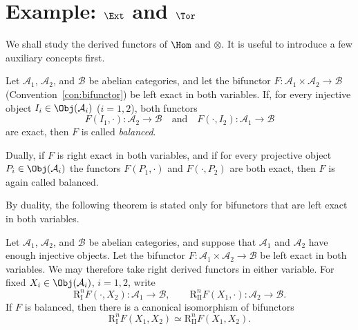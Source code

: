 
\section{Example: \texorpdfstring{$\Ext$}{Ext} and \texorpdfstring{$\Tor$}{Tor}}\label{sec:Ext-Tor}
\hypertarget{o014.aljabr2.chapter3.ext-tor}{ }

We shall study the derived functors of $\Hom$ and $\otimes$. It is useful to
introduce a few auxiliary concepts first.

\begin{definition}\label{def:balanced-functor}
Let $\mathcal{A}_1$, $\mathcal{A}_2$, and $\mathcal{B}$ be abelian categories,
and let the bifunctor $F:\mathcal{A}_1\times\mathcal{A}_2\to\mathcal{B}$
(Convention~\ref{con:bifunctor}) be left exact in both variables. If, for
every injective object $I_i\in\Obj(\mathcal{A}_i)$ ($i=1,2$), both functors
\[
F(I_1,\cdot):\mathcal{A}_2\to\mathcal{B}\quad\text{and}\quad
F(\cdot,I_2):\mathcal{A}_1\to\mathcal{B}
\]
are exact, then $F$ is called \emph{balanced}.

Dually, if $F$ is right exact in both variables, and if for every projective
object $P_i\in\Obj(\mathcal{A}_i)$ the functors $F(P_1,\cdot)$ and
$F(\cdot,P_2)$ are both exact, then $F$ is again called balanced.
\end{definition}

By duality, the following theorem is stated only for bifunctors that are left
exact in both variables.

\begin{theorem}\label{prop:balanced-primer}
Let $\mathcal{A}_1$, $\mathcal{A}_2$, and $\mathcal{B}$ be abelian
categories, and suppose that $\mathcal{A}_1$ and $\mathcal{A}_2$ have enough
injective objects. Let the bifunctor
$F:\mathcal{A}_1\times\mathcal{A}_2\to\mathcal{B}$ be left exact in both
variables. We may therefore take right derived functors in either variable.
For fixed $X_i\in\Obj(\mathcal{A}_i)$, $i=1,2$, write
\[
\mathrm{R}_{\mathrm{I}}^n F(\cdot,X_2):\mathcal{A}_1\to\mathcal{B},\qquad
\mathrm{R}_{\mathrm{II}}^n F(X_1,\cdot):\mathcal{A}_2\to\mathcal{B}.
\]
If $F$ is balanced, then there is a canonical isomorphism of bifunctors
\[
\mathrm{R}_{\mathrm{I}}^nF(X_1,X_2)\simeq
\mathrm{R}_{\mathrm{II}}^nF(X_1,X_2).
\]
\end{theorem}

